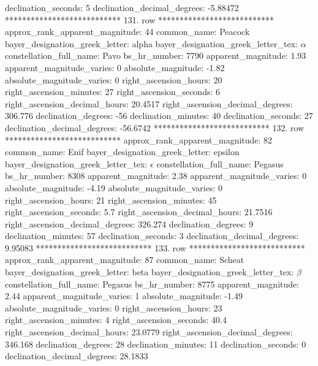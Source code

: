                declination_seconds: 5
       declination_decimal_degrees: -5.88472
*************************** 131. row ***************************
    approx_rank_apparent_magnitude: 44
                       common_name: Peacock
    bayer_designation_greek_letter: alpha
bayer_designation_greek_letter_tex: $\alpha$
           constellation_full_name: Pavo
                      bs_hr_number: 7790
                apparent_magnitude: 1.93
         apparent_magnitude_varies: 0
                absolute_magnitude: -1.82
         absolute_magnitude_varies: 0
             right_ascension_hours: 20
           right_ascension_minutes: 27
           right_ascension_seconds: 6
     right_ascension_decimal_hours: 20.4517
   right_ascension_decimal_degrees: 306.776
               declination_degrees: -56
               declination_minutes: 40
               declination_seconds: 27
       declination_decimal_degrees: -56.6742
*************************** 132. row ***************************
    approx_rank_apparent_magnitude: 82
                       common_name: Enif
    bayer_designation_greek_letter: epsilon
bayer_designation_greek_letter_tex: $\epsilon$
           constellation_full_name: Pegasus
                      bs_hr_number: 8308
                apparent_magnitude: 2.38
         apparent_magnitude_varies: 0
                absolute_magnitude: -4.19
         absolute_magnitude_varies: 0
             right_ascension_hours: 21
           right_ascension_minutes: 45
           right_ascension_seconds: 5.7
     right_ascension_decimal_hours: 21.7516
   right_ascension_decimal_degrees: 326.274
               declination_degrees: 9
               declination_minutes: 57
               declination_seconds: 3
       declination_decimal_degrees: 9.95083
*************************** 133. row ***************************
    approx_rank_apparent_magnitude: 87
                       common_name: Scheat
    bayer_designation_greek_letter: beta
bayer_designation_greek_letter_tex: $\beta$
           constellation_full_name: Pegasus
                      bs_hr_number: 8775
                apparent_magnitude: 2.44
         apparent_magnitude_varies: 1
                absolute_magnitude: -1.49
         absolute_magnitude_varies: 0
             right_ascension_hours: 23
           right_ascension_minutes: 4
           right_ascension_seconds: 40.4
     right_ascension_decimal_hours: 23.0779
   right_ascension_decimal_degrees: 346.168
               declination_degrees: 28
               declination_minutes: 11
               declination_seconds: 0
       declination_decimal_degrees: 28.1833

